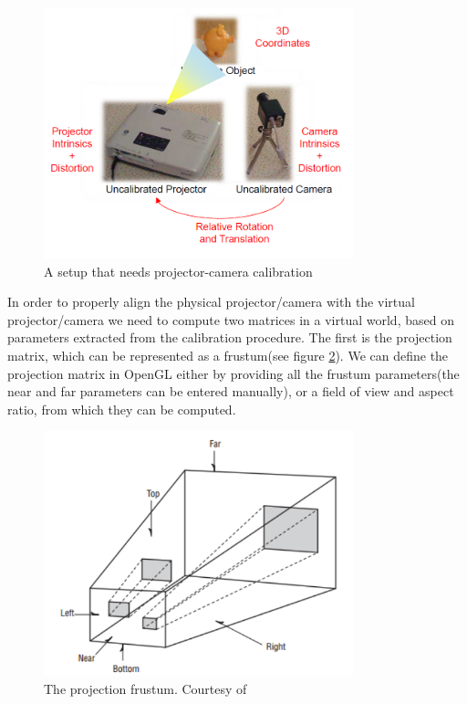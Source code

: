 \documentclass[]{article}
\begin{document}
\begin{figure}[hbtp]
    \centering
    \includegraphics[width=0.8\textwidth]{figures/Projector-Camera_Calibration.PNG}
    \caption{A setup that needs projector-camera calibration}
    \label{fig:ProjectorCameraSetup}
\end{figure}

In order to properly align the physical projector/camera with the virtual projector/camera we need to compute two matrices in a virtual world, based on parameters extracted from the calibration procedure. The first is the projection matrix, which can be represented as a frustum(see figure \ref{fig:Frustum}). We can define the projection matrix in OpenGL either by providing all the frustum parameters(the near and far parameters can be entered manually), or a field of view and aspect ratio, from which they can be computed. 
\begin{figure}[hbtp]
    \centering
    \includegraphics[width=0.8\textwidth]{figures/Frustum.PNG}
    \caption{The projection frustum. Courtesy of \cite{superbible}}
    \label{fig:Frustum}
\end{figure}
\end{document}
